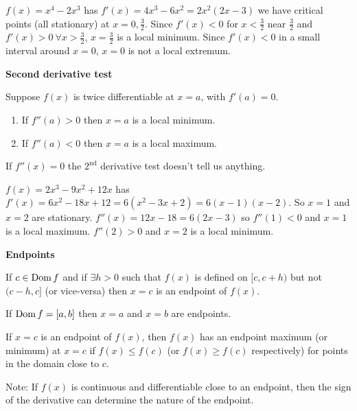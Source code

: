 \documentclass[10pt, a4paper]{article}
\begin{document}
\begin{example}
    $f(x) = x ^ 4 - 2x ^ 3$ has $f'(x) = 4x ^ 3 - 6x ^ 2 = 2x ^ 2(2x - 3)$
    we have critical points (all stationary) at $x = 0, \frac{3}{2}$.
    Since $f'(x) < 0$ for $x < \frac{3}{2}$ near $\frac{3}{2}$ and
    $f'(x) > 0\ \forall x > \frac{3}{2}$,
    $x = \frac{3}{2}$ is a local minimum.
    Since $f'(x) < 0$ in a small interval around $x = 0$,
    $x = 0$ is not a local extremum.
\end{example}


\textbf{Second derivative test}

Suppose $f(x)$ is twice differentiable at $x = a$,
with $f'(a) = 0$.
\begin{enumerate}[label = \roman*)]
    \item If $f''(a) > 0$ then $x = a$ is a local minimum.
    \item If $f''(a) < 0$ then $x = a$ is a local maximum.
\end{enumerate}
If $f''(x) = 0$ the $2^{\text{nd}}$ derivative test doesn't tell us anything.

\begin{example}
    $f(x) = 2x ^ 3 - 9x ^ 2 + 12x$ has $f'(x) = 6x ^ 2 - 18x + 12 = 6(x ^ 2 - 3x + 2) = 6(x - 1)(x - 2)$.
    So $x = 1$ and $x = 2$ are stationary.
    $f''(x) = 12x - 18 = 6(2x - 3)$
    so $f''(1) < 0$ and $x = 1$ is a local maximum.
    $f''(2) > 0$ and $x = 2$ is a local minimum.
\end{example}

\textbf{Endpoints}
\begin{definition}
    If $c \in \operatorname{Dom} f$ and if $\exists h > 0$ such that $f(x)$ is defined on $[c, c + h)$ but not $(c - h, c]$ (or vice-versa)
    then $x = c$ is an endpoint of $f(x)$.
\end{definition}

\begin{example}
    If $\operatorname{Dom} f = [a, b]$ then $x = a$ and $x = b$ are endpoints.
\end{example}

\begin{definition}
    If $x = c$ is an endpoint of $f(x)$,
    then $f(x)$ has an endpoint maximum (or minimum) at $x = c$
    if $f(x) \leq f(c)$ (or $f(x) \geq f(c)$ respectively)
    for points in the domain close to $c$.
\end{definition}

Note: If $f(x)$ is continuous and differentiable close to an endpoint,
then the sign of the derivative can determine the nature of the endpoint.
\end{document}
